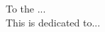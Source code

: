 \begin{center}
\large
    To the ...\\
    This \DocumentType{} is dedicated to...\\
    
\end{center}
